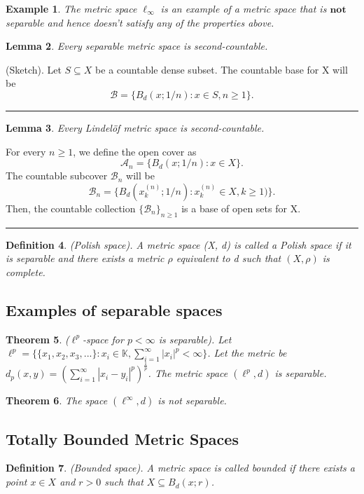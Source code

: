 \documentclass[twoside]{article}
\newcounter{lecnum}
\newtheorem{theorem}{Theorem}[lecnum]
\newtheorem{lemma}[theorem]{Lemma}
\newtheorem{definition}[theorem]{Definition}
\newtheorem{example}[theorem]{Example}
\newenvironment{proof}{{\bf Proof:}}{\hfill\rule{2mm}{2mm}}
\begin{document}
\begin{example}The metric space $\ell_{\infty}$ is an example of a metric space that is $\textbf{not}$ separable and hence doesn't satisfy any of the properties above.
\end{example}

\begin{lemma} Every separable metric space is second-countable.
\end{lemma}
\begin{proof} (Sketch). Let $S \subseteq X$ be a countable dense subset. The countable base for X will be 
$$
\mathcal{B} = \{B_d(x; 1/n): x \in S, n \geq 1 \}.
$$
\end{proof}

\begin{lemma} Every Lindelöf metric space is second-countable.
\end{lemma}
\begin{proof} For every $n \geq 1$, we define the open cover as 
$$
\mathcal{A}_n = \{B_d(x; 1/n): x \in X\}.
$$
The countable subcover $\mathcal{B}_n$ will be 
$$
\mathcal{B}_n = \{B_d(x_k^{(n)}; 1/n): x_k^{(n)} \in X, k \geq 1) \}.
$$
Then, the countable collection $\{\mathcal{B}_n\}_{n \geq 1}$ is a base of open sets for X.
\end{proof}

\begin{definition}(Polish space). A metric space (X, d) is called a Polish space if it is separable and there exists a metric $\rho$ equivalent to d such that $(X, \rho)$ is complete.
\end{definition}

\subsection{Examples of separable spaces}

\begin{theorem}($\ell^p$-space for $p < \infty$ is separable). Let $\ell^p = \{\{x_1,x_2,x_3,...\}: x_i \in \mathbb{K}, \sum_{i=1}^{\infty}|x_i|^p < \infty\}$. Let the metric be $d_p(x,y) = (\sum_{i=1}^{\infty}|x_i-y_i|^p)^{\frac{1}{p}}$. The metric space $(\ell^p,d)$ is separable.
\end{theorem}

\begin{theorem}The space $(\ell^{\infty}, d)$ is not separable.
\end{theorem}
\subsection{Totally Bounded Metric Spaces}
\begin{definition}(Bounded space). A metric space is called bounded if there exists a point $x \in X$ and $r > 0$ such that $X \subseteq B_d(x;r)$.
\end{definition}
\end{document}
